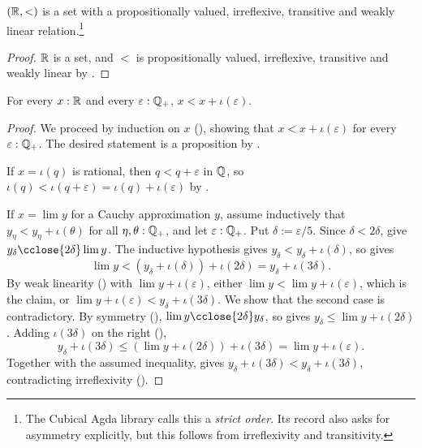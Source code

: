 \begin{corollary}
  \label{RLtStrictOrder}
  $(\mathbb{R}, <)$ is a set with a propositionally valued, irreflexive, transitive and weakly linear relation.\footnote{The Cubical Agda library calls this a \emph{strict order}. Its record also asks for asymmetry explicitly, but this follows from irreflexivity and transitivity.}
\end{corollary}
\begin{proof}
  $\mathbb{R}$ is a set, and $<$ is propositionally valued, irreflexive, transitive and weakly linear by .
\end{proof}

\begin{lemma}
  \label{ltAddRatReal}
  For every $x : \mathbb{R}$ and every $\varepsilon : \mathbb{Q}_{+}$, $x < x + \iota(\varepsilon)$.
\end{lemma}
\begin{proof}
  We proceed by induction on $x$ (), showing that $x < x + \iota(\varepsilon)$ for every $\varepsilon : \mathbb{Q}_{+}$. The desired statement is a proposition by .

  If $x = \iota(q)$ is rational, then $q < q + \varepsilon$ in $\mathbb{Q}$, so $\iota(q) < \iota(q + \varepsilon) = \iota(q) + \iota(\varepsilon)$ by .

  If $x = \lim y$ for a Cauchy approximation $y$, assume inductively that $y_\eta < y_\eta + \iota(\theta)$ for all $\eta, \theta : \mathbb{Q}_{+}$, and let $\varepsilon : \mathbb{Q}_{+}$. Put $\delta := \varepsilon/5$. Since $\delta < 2\delta$,  give $y_\delta \cclose{2\delta} \lim y$. The inductive hypothesis gives $y_\delta < y_\delta + \iota(\delta)$, so  gives
  \[
    \lim y < (y_\delta + \iota(\delta)) + \iota(2\delta) = y_\delta + \iota(3\delta).
  \]
  By weak linearity () with $\lim y + \iota(\varepsilon)$, either $\lim y < \lim y + \iota(\varepsilon)$, which is the claim, or $\lim y + \iota(\varepsilon) < y_\delta + \iota(3\delta)$. We show that the second case is contradictory. By symmetry (), $\lim y \cclose{2\delta} y_\delta$, so  gives $y_\delta \le \lim y + \iota(2\delta)$. Adding $\iota(3\delta)$ on the right (),
  \[
    y_\delta + \iota(3\delta) \le (\lim y + \iota(2\delta)) + \iota(3\delta) = \lim y + \iota(\varepsilon).
  \]
  Together with the assumed inequality,  gives $y_\delta + \iota(3\delta) < y_\delta + \iota(3\delta)$, contradicting irreflexivity ().
\end{proof}

